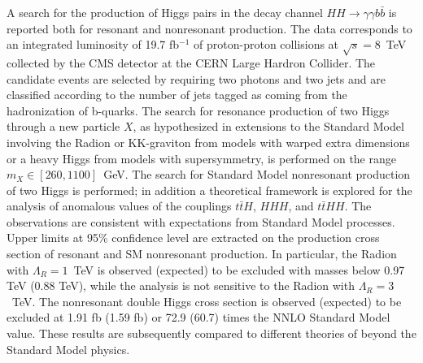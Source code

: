 A search for the production of Higgs pairs in the decay channel
$HH \rightarrow \gamma\gamma b\bar{b}$ is reported both for
resonant and nonresonant production. The data corresponds to an integrated
luminosity of 19.7 fb$^{-1}$ of proton-proton collisions at $\sqrt{s}=8$~TeV collected by the
CMS detector at the CERN Large Hardron Collider.
The candidate events are selected by requiring two photons and two jets and are classified
according to the number of jets tagged as coming from the hadronization of b-quarks.
The search for resonance production of two Higgs
through a new particle $X$, as hypothesized in extensions
to the Standard Model involving the Radion or KK-graviton from models with warped extra dimensions
or a heavy Higgs from models with supersymmetry,
is performed on the range $m_X \in [260, 1100]$~GeV.
The search for Standard Model nonresonant production of two Higgs is performed; in addition
a theoretical framework is explored for the analysis of anomalous values of the couplings
$t\bar{t}H$, $HHH$, and $t\bar{t}HH$.
The observations are consistent with expectations from Standard Model processes.
Upper limits at 95\% confidence level are extracted on the production cross section
of resonant and SM nonresonant production.
In particular, the Radion with $\Lambda_R = 1$~TeV is observed (expected) to be excluded with masses
below 0.97 TeV (0.88 TeV), while the analysis is not sensitive to the Radion with $\Lambda_R = 3$~TeV.
The nonresonant double Higgs cross section is observed (expected) to be excluded at
1.91 fb (1.59 fb) or 72.9 (60.7) times the NNLO Standard Model value.
These results are subsequently compared to different theories of beyond the Standard Model physics.
